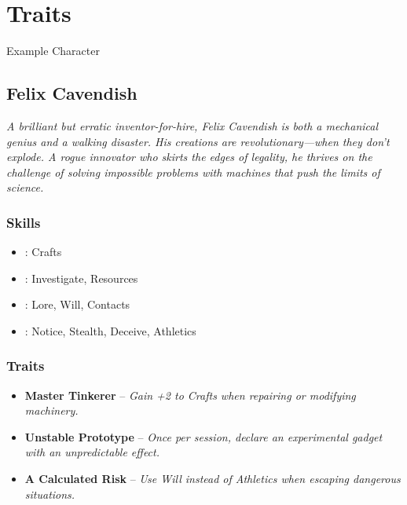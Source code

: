 \section{Traits}
\label{core:traits}

\begin{DndSidebar}[float=!t]{Example Character}
	\subsection{Felix Cavendish}
	\emph{A brilliant but erratic inventor-for-hire, Felix Cavendish is both a mechanical genius and a walking disaster. His creations are revolutionary—when they don’t explode. A rogue innovator who skirts the edges of legality, he thrives on the challenge of solving impossible problems with machines that push the limits of science.}

	\subsubsection*{Skills}
	\begin{itemize}
    	\item \Expert: Crafts
	    \item \Skilled: Investigate, Resources
    	\item \Novice: Lore, Will, Contacts
	    \item \Untrained: Notice, Stealth, Deceive, Athletics
	\end{itemize}

	\subsubsection*{Traits}
	\begin{itemize}
    	\item \textbf{Master Tinkerer} – \emph{Gain +2 to Crafts when repairing or modifying machinery.}
	    \item \textbf{Unstable Prototype} – \emph{Once per session, declare an experimental gadget with an unpredictable effect.}
    	\item \textbf{A Calculated Risk} – \emph{Use Will instead of Athletics when escaping dangerous situations.}
	\end{itemize}
\end{DndSidebar}

